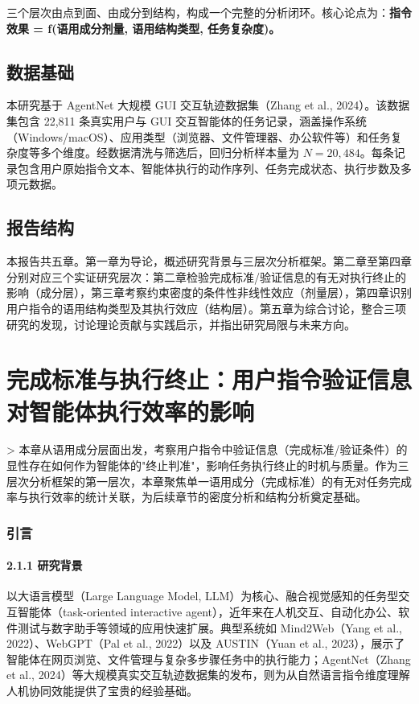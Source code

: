 \documentclass[12pt,a4paper,openany,oneside]{ctexrep}
\begin{document}
三个层次由点到面、由成分到结构，构成一个完整的分析闭环。核心论点为：\textbf{指令效果 = f(语用成分剂量, 语用结构类型, 任务复杂度)。}

\section{数据基础}


本研究基于 AgentNet 大规模 GUI 交互轨迹数据集（Zhang et al., 2024）。该数据集包含 22,811 条真实用户与 GUI 交互智能体的任务记录，涵盖操作系统（Windows/macOS）、应用类型（浏览器、文件管理器、办公软件等）和任务复杂度等多个维度。经数据清洗与筛选后，回归分析样本量为 $N=20{,}484$。每条记录包含用户原始指令文本、智能体执行的动作序列、任务完成状态、执行步数及多项元数据。

\section{报告结构}


本报告共五章。第一章为导论，概述研究背景与三层次分析框架。第二章至第四章分别对应三个实证研究层次：第二章检验完成标准/验证信息的有无对执行终止的影响（成分层），第三章考察约束密度的条件性非线性效应（剂量层），第四章识别用户指令的语用结构类型及其执行效应（结构层）。第五章为综合讨论，整合三项研究的发现，讨论理论贡献与实践启示，并指出研究局限与未来方向。

\newpage

\chapter{完成标准与执行终止：用户指令验证信息对智能体执行效率的影响}


> 本章从语用成分层面出发，考察用户指令中验证信息（完成标准/验证条件）的显性存在如何作为智能体的"终止判准"，影响任务执行终止的时机与质量。作为三层次分析框架的第一层次，本章聚焦单一语用成分（完成标准）的有无对任务完成率与执行效率的统计关联，为后续章节的密度分析和结构分析奠定基础。


\subsection{引言}


\subsubsection{2.1.1 研究背景}


以大语言模型（Large Language Model, LLM）为核心、融合视觉感知的任务型交互智能体（task-oriented interactive agent），近年来在人机交互、自动化办公、软件测试与数字助手等领域的应用快速扩展。典型系统如 Mind2Web（Yang et al., 2022）、WebGPT（Pal et al., 2022）以及 AUSTIN（Yuan et al., 2023），展示了智能体在网页浏览、文件管理与复杂多步骤任务中的执行能力；AgentNet（Zhang et al., 2024）等大规模真实交互轨迹数据集的发布，则为从自然语言指令维度理解人机协同效能提供了宝贵的经验基础。
\end{document}
